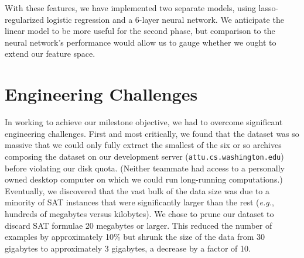 \documentclass{article}
\begin{document}

\noindent
With these features, we have implemented two separate models, using
lasso-regularized logistic regression and a 6-layer neural network. We
anticipate the linear model to be more useful for the second phase, but
comparison to the neural network's performance would allow us to gauge whether
we ought to extend our feature space.

\section*{Engineering Challenges}
In working to achieve our milestone objective, we had to overcome significant
engineering challenges. First and most critically, we found that the dataset was
so massive that we could only fully extract the smallest of the six or so
archives composing the dataset on our development server
(\texttt{attu.cs.washington.edu}) before violating our disk quota. (Neither
teammate had access to a personally owned desktop computer on which we could run
long-running computations.) Eventually, we discovered that the vast bulk of the
data size was due to a minority of SAT instances that were significantly larger
than the rest (\textit{e.g.}, hundreds of megabytes versus kilobytes). We chose
to prune our dataset to discard SAT formulae 20 megabytes or larger. This
reduced the number of examples by approximately 10\% but shrunk the size of the
data from 30 gigabytes to approximately 3 gigabytes, a decrease by a factor of
10.
\end{document}
